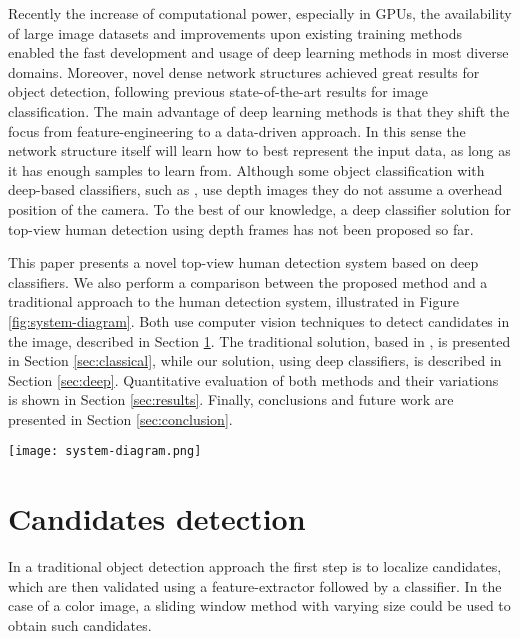   Recently the increase of computational power, especially in GPUs, the availability of large image datasets and improvements upon existing training methods \cite{nair2010relu} enabled the fast development and usage of deep learning methods in most diverse domains. Moreover, novel dense network structures \cite{NIPS2013_5207} achieved great results for object detection, following previous state-of-the-art results \cite{hintonCONVNET} for image classification. The main advantage of deep learning methods is that they shift the focus from feature-engineering to a data-driven approach. In this sense the network structure itself will learn how to best represent the input data, as long as it has enough samples to learn from. Although some object classification with deep-based classifiers, such as \cite{thornberg2015combining}, use depth images they do not assume a overhead position of the camera. To the best of our knowledge, a deep classifier solution for top-view human detection using depth frames has not been proposed so far.

  This paper presents a novel top-view human detection system based on deep classifiers. We also perform a comparison between the proposed method and a traditional approach to the human detection system, illustrated in Figure \ref{fig:system-diagram}. Both use computer vision techniques to detect candidates in the image, described in Section \ref{sec:candidates}. The traditional solution, based in \cite{rauter}, is presented in Section \ref{sec:classical}, while our solution, using deep classifiers, is described in Section \ref{sec:deep}. Quantitative evaluation of both methods and their variations is shown in Section \ref{sec:results}. Finally, conclusions and future work are presented in Section \ref{sec:conclusion}.

  \begin{figure*}[!t]
  \centering
  \texttt{[image: system-diagram.png]}
  \caption{Human detection system diagram.}
  \label{fig:system-diagram}
  \end{figure*}

\section{Candidates detection}
\label{sec:candidates}

    In a traditional object detection approach \cite{traditional-objdetect} the first step is to localize candidates, which are then validated using a feature-extractor followed by a classifier. In the case of a color image, a sliding window method with varying size could be used to obtain such candidates.

